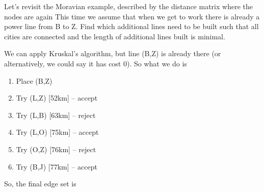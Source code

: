 

Let's revisit the Moravian example, described by the distance matrix 
where the nodes are again 
This time we assume that when we get to work there is already a power line from B to Z. Find which additional lines need to be built such that all cities are connected and the length of additional lines built is minimal. 


\solution
We can apply Kruskal's algorithm, but line (B,Z) is already there (or alternatively, we could say it has cost 0). So what we do is
\begin{enumerate}[label=\arabic*.]
\item Place (B,Z)
\item Try (L,Z) [52km] -- accept
\item Try (L,B) [63km] -- reject
\item Try (L,O) [75km] -- accept
\item Try (O,Z) [76km] -- reject
\item Try (B,J) [77km] -- accept
\end{enumerate}
So, the final edge set is 

